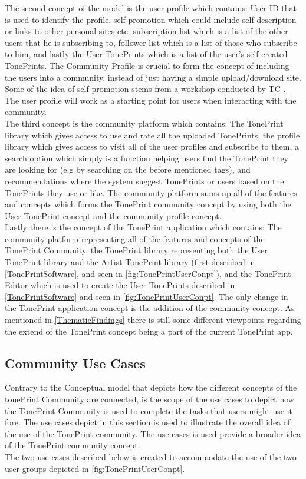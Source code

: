 \noindent
The second concept of the model is the user profile which contains: User ID that is used to identify the profile, self-promotion which could include self description or links to other personal sites etc. subscription list which is a list of the other users that he is subscribing to, follower list which is a list of those who subscribe to him, and lastly the User TonePrints which is a list of the user's self created TonePrints. The Community Profile is crucial to form the concept of including the users into a community, instead of just having a simple upload/download site. Some of the idea of self-promotion stems from a workshop conducted by TC \parencite{PDF:BrugerWorkshopUserTonePrints}. The user profile will work as a starting point for users when interacting with the community.\\

\noindent
The third concept is the community platform which contains: The TonePrint library which gives access to use and rate all the uploaded TonePrints, the profile library which gives access to visit all of the user profiles and subscribe to them, a search option which simply is a function helping users find the TonePrint they are looking for (e.g by searching on the before mentioned tags), and recommendations where the system suggest TonePrints or users based on the TonePrints they use or like. The community platform sums up all of the features and concepts which forms the TonePrint community concept by using both the User TonePrint concept and the community profile concept.\\

\noindent
Lastly there is the concept of the TonePrint application which contains: The community platform representing all of the features and concepts of the TonePrint Community, the TonePrint library representing both the User TonePrint library and the Artist TonePrint library (first described in \autoref{TonePrintSoftware}, and seen in \autoref{fig:TonePrintUserConpt}), and the TonePrint Editor which is used to create the User TonePrints described in \autoref{TonePrintSoftware} and seen in \autoref{fig:TonePrintUserConpt}. The only change in the TonePrint application concept is the addition of the community concept. As mentioned in \autoref{ThematicFindings} there is still some different viewpoints regarding the extend of the TonePrint concept being a part of the current TonePrint app. 

\subsection{Community Use Cases}
\label{CommunityUseCases}
Contrary to the Conceptual model that depicts how the different concepts of the tonePrint Community are connected, is the scope of the use cases to depict how the TonePrint Community is used to complete the tasks that users might use it fore. The use cases depict in this section is used to illustrate the overall idea of the use of the TonePrint community. The use cases is used provide a broader idea of the TonePrint community concept.\\
The two use cases described below is created to accommodate the use of the two user groups depicted in \autoref{fig:TonePrintUserConpt}.

